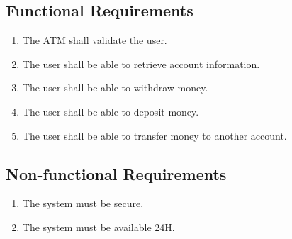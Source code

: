 \documentclass{article}
\begin{document}
	\subsection{Functional Requirements}


	\begin{enumerate}[label*=\arabic*.]
		\item The ATM shall validate the user.
		\item The user shall be able to retrieve account information.	
		\item The user shall be able to withdraw money.
		\item The user shall be able to deposit money.
		\item The user shall be able to transfer money to another account.
	\end{enumerate}

	\subsection{Non-functional Requirements}
	\begin{enumerate}
		\item The system must be secure.
		\item The system must be available 24H.
	\end{enumerate}
\end{document}
